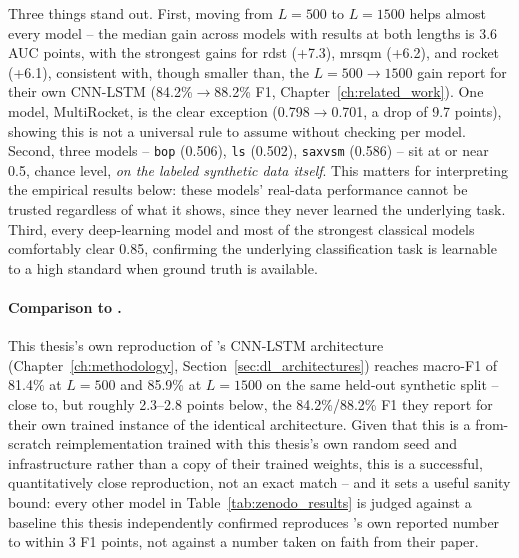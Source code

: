 Three things stand out. First, moving from $L=500$ to $L=1500$ helps almost every model -- the median gain across models with results at both lengths is 3.6 AUC points, with the strongest gains for rdst (+7.3), mrsqm (+6.2), and rocket (+6.1), consistent with, though smaller than, the $L=500\to1500$ gain \citet{bury2021} report for their own CNN-LSTM (84.2\%$\to$88.2\% F1, Chapter~\ref{ch:related_work}). One model, MultiRocket, is the clear exception (0.798$\to$0.701, a drop of 9.7 points), showing this is not a universal rule to assume without checking per model. Second, three models -- \texttt{bop} (0.506), \texttt{ls} (0.502), \texttt{saxvsm} (0.586) -- sit at or near 0.5, chance level, \emph{on the labeled synthetic data itself}. This matters for interpreting the empirical results below: these models' real-data performance cannot be trusted regardless of what it shows, since they never learned the underlying task. Third, every deep-learning model and most of the strongest classical models comfortably clear 0.85, confirming the underlying classification task is learnable to a high standard when ground truth is available.

\paragraph{Comparison to \citet{bury2021}.} This thesis's own reproduction of \citet{bury2021}'s CNN-LSTM architecture (Chapter~\ref{ch:methodology}, Section~\ref{sec:dl_architectures}) reaches macro-F1 of 81.4\% at $L=500$ and 85.9\% at $L=1500$ on the same held-out synthetic split -- close to, but roughly 2.3--2.8 points below, the 84.2\%/88.2\% F1 they report for their own trained instance of the identical architecture. Given that this is a from-scratch reimplementation trained with this thesis's own random seed and infrastructure rather than a copy of their trained weights, this is a successful, quantitatively close reproduction, not an exact match -- and it sets a useful sanity bound: every other model in Table~\ref{tab:zenodo_results} is judged against a baseline this thesis independently confirmed reproduces \citet{bury2021}'s own reported number to within 3 F1 points, not against a number taken on faith from their paper.

